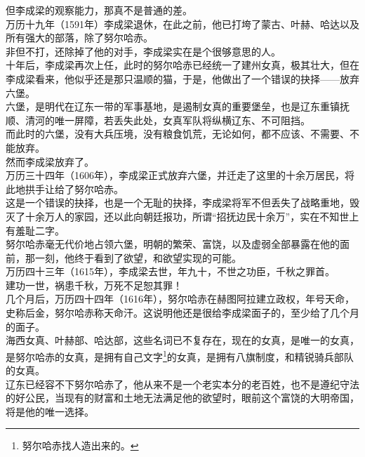 \begin{multicols}{\theparacolNo}
但李成梁的观察能力，那真不是普通的差。\\

万历十九年（1591年）李成梁退休，在此之前，他已打垮了蒙古、叶赫、哈达以及所有强大的部落，除了努尔哈赤。\\

非但不打，还除掉了他的对手，李成梁实在是个很够意思的人。\\

十年后，李成梁再次上任，此时的努尔哈赤已经统一了建州女真，极其壮大，但在李成梁看来，他似乎还是那只温顺的猫，于是，他做出了一个错误的抉择——放弃六堡。\\

六堡，是明代在辽东一带的军事基地，是遏制女真的重要堡垒，也是辽东重镇抚顺、清河的唯一屏障，若丢失此处，女真军队将纵横辽东、不可阻挡。\\

而此时的六堡，没有大兵压境，没有粮食饥荒，无论如何，都不应该、不需要、不能放弃。\\

然而李成梁放弃了。\\

万历三十四年（1606年），李成梁正式放弃六堡，并迁走了这里的十余万居民，将此地拱手让给了努尔哈赤。\\

这是一个错误的抉择，也是一个无耻的抉择，李成梁将军不但丢失了战略重地，毁灭了十余万人的家园，还以此向朝廷报功，所谓“招抚边民十余万”，实在不知世上有羞耻二字。\\

努尔哈赤毫无代价地占领六堡，明朝的繁荣、富饶，以及虚弱全部暴露在他的面前，那一刻，他终于看到了欲望，和欲望实现的可能。\\

万历四十三年（1615年），李成梁去世，年九十，不世之功臣，千秋之罪首。\\

建功一世，祸患千秋，万死不足恕其罪！\\

几个月后，万历四十四年（1616年），努尔哈赤在赫图阿拉建立政权，年号天命，史称后金，努尔哈赤称天命汗。这说明他还是很给李成梁面子的，至少给了几个月的面子。\\

海西女真、叶赫部、哈达部，这些名词已不复存在，现在的女真，是唯一的女真，是努尔哈赤的女真，是拥有自己文字\footnote{努尔哈赤找人造出来的。}的女真，是拥有八旗制度，和精锐骑兵部队的女真。\\

辽东已经容不下努尔哈赤了，他从来不是一个老实本分的老百姓，也不是遵纪守法的好公民，当现有的财富和土地无法满足他的欲望时，眼前这个富饶的大明帝国，将是他的唯一选择。\\


\end{multicols}
